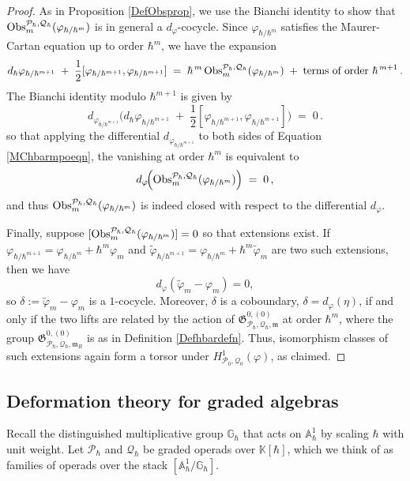 \documentclass[11pt]{amsart}
\numberwithin{equation}{section}
\theoremstyle{definition}
\newcommand{\bb}{\mathbb}
\newcommand{\mc}{\mathcal}
\newcommand{\mf}{\mathfrak}
\newcommand{\Ph}{{\mathcal{P}_\hbar}}
\newcommand{\Qh}{{\mathcal{Q}_\hbar}}
\newcommand{\ik}{{\bb K}}
\newcommand{\Obs}{{\textup{Obs}}}
\newcommand{\0}{{\textbf{0}}}
\def\IA{\mathbb{A}}
\def\IG{\mathbb{G}}
\def\PP{{\mc P}}
\def\QQ{{\mc Q}}
\def \mf{\mathfrak}
\begin{document}
\begin{proof}
As in Proposition \ref{DefObsprop}, we use the Bianchi identity to show that $\Obs_m^{\Ph,\Qh}(\varphi_{\hbar/\hbar^m})$ is in general a $d_\varphi$-cocycle. Since $\varphi_{\hbar/\hbar^m}$ satisfies the Maurer-Cartan equation up to order $\hbar^m$, we have the expansion 
\begin{equation}\label{MChbarmpoeqn}
	d_\hbar\varphi_{\hbar/\hbar^{m+1}} \;+\; \frac{1}{2}[\varphi_{\hbar/\hbar^{m+1}},\varphi_{\hbar/\hbar^{m+1}}] \;=\; \hbar^{\,m}\,\Obs_m^{\Ph,\Qh}(\varphi_{\hbar/\hbar^m}) \;+\; \textup{terms of order } \hbar^{\,m+1}\,.
\end{equation}
The Bianchi identity modulo $\hbar^{m+1}$ is given by
\[ 
d_{\varphi_{ \hbar / \hbar^{m+1}}}\!\Big(d_\hbar\varphi_{\hbar/\hbar^{m+1}} \;+\; \frac{1}{2}[\varphi_{\hbar/\hbar^{m+1}},\varphi_{\hbar/\hbar^{m+1}}] \Big) \;=\; 0\,.
\] 
so that applying the differential $d_{\varphi_{ \hbar / \hbar^{m+1}}}$ to both sides of Equation \ref{MChbarmpoeqn}, the vanishing at order $\hbar^m$ is equivalent to
\[ 
d_\varphi\!\Big(\Obs_m^{\Ph,\Qh}(\varphi_{\hbar/\hbar^m})\Big) \;=\; 0\,,
\] 
and thus $\Obs_m^{\Ph,\Qh}(\varphi_{\hbar/\hbar^m})$ is indeed closed with respect to the differential $d_\varphi$.


Finally, suppose $[\Obs_m^{\Ph,\Qh}(\varphi_{\hbar/\hbar^m})]=0$ so that extensions exist. If $\varphi_{\hbar/\hbar^{m+1}}=\varphi_{\hbar/\hbar^m}+\hbar^m\varphi_m$ and $\tilde\varphi_{\hbar/\hbar^{m+1}}=\varphi_{\hbar/\hbar^m}+\hbar^m\tilde \varphi_m$ are two such extensions, then we have
\[
d_\varphi(\tilde\varphi_m-\varphi_m)=0,
\]
so $\delta:=\tilde\varphi_m-\varphi_m$ is a $1$-cocycle. Moreover, $\delta$ is a coboundary, $\delta=d_\varphi(\eta)$, if and only if the two lifts are related by the action of
$\mf G^{0,(0)}_{\Ph,\Qh,\mf m}$ at order $\hbar^m$, where the group $\mf G^{0,(0)}_{\Ph,\Qh,\mf m_R}$ is as in Definition \ref{Defhbardefn}. Thus, isomorphism classes of such extensions again form a torsor under $H^1_{\mc P_0,\mc Q_0}(\varphi)$, as claimed.
\end{proof}




\subsection{Deformation theory for graded algebras}\label{ssec:graded def}

Recall the distinguished multiplicative group $\IG_\hbar$ that acts on $\IA^1_\hbar$ by scaling $\hbar$ with unit weight. Let $\PP_\hbar$ and $\QQ_\hbar$ be graded operads over $\ik[\hbar]$, which we think of as families of operads over the stack $[\IA^1_\hbar/\IG_\hbar]$.
\end{document}
